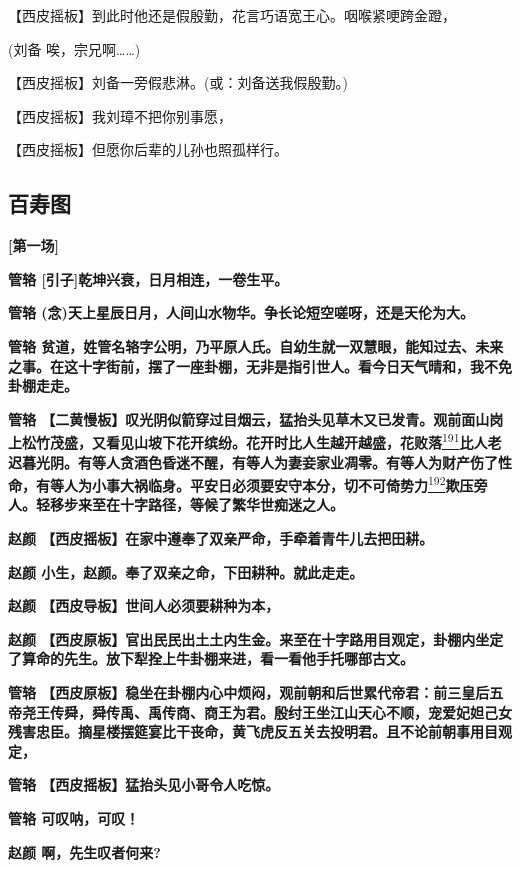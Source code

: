 【西皮摇板】到此时他还是假殷勤，花言巧语宽王心。咽喉紧哽跨金蹬，

(刘备 唉，宗兄啊\ldots{}\ldots{})

【西皮摇板】刘备一旁假悲淋。(或：刘备送我假殷勤。)

【西皮摇板】我刘璋不把你别事愿，

【西皮摇板】但愿你后辈的儿孙也照孤样行。

\hypertarget{ux767eux5bffux56fe}{%
\subsection{百寿图}\label{ux767eux5bffux56fe}}

\textbf{{[}第一场{]}}

\textbf{管辂 {[}引子{]}乾坤兴衰，日月相连，一卷生平。}

\textbf{管辂
(念)天上星辰日月，人间山水物华。争长论短空嗟呀，还是天伦为大。}

\textbf{管辂
贫道，姓管名辂字公明，乃平原人氏。自幼生就一双慧眼，能知过去、未来之事。在这十字街前，摆了一座卦棚，无非是指引世人。看今日天气晴和，我不免卦棚走走。}

\textbf{管辂
【二黄慢板】叹光阴似箭穿过目烟云，猛抬头见草木又已发青。观前面山岗上松竹茂盛，又看见山坡下花开缤纷。花开时比人生越开越盛，花败落}\protect\hyperlink{fn191}{\textsuperscript{191}}\textbf{比人老迟暮光阴。有等人贪酒色昏迷不醒，有等人为妻妾家业凋零。有等人为财产伤了性命，有等人为小事大祸临身。平安日必须要安守本分，切不可倚势力}\protect\hyperlink{fn192}{\textsuperscript{192}}\textbf{欺压旁人。轻移步来至在十字路径，等候了繁华世痴迷之人。}

\textbf{赵颜 【西皮摇板】在家中遵奉了双亲严命，手牵着青牛儿去把田耕。}

\textbf{赵颜 小生，赵颜。奉了双亲之命，下田耕种。就此走走。}

\textbf{赵颜 【西皮导板】世间人必须要耕种为本，}

\textbf{赵颜
【西皮原板】官出民民出土土内生金。来至在十字路用目观定，卦棚内坐定了算命的先生。放下犁拴上牛卦棚来进，看一看他手托哪部古文。}

\textbf{管辂
【西皮原板】稳坐在卦棚内心中烦闷，观前朝和后世累代帝君：前三皇后五帝尧王传舜，舜传禹、禹传商、商王为君。殷纣王坐江山天心不顺，宠爱妃妲己女残害忠臣。摘星楼摆筵宴比干丧命，黄飞虎反五关去投明君。且不论前朝事用目观定，}

\textbf{管辂 【西皮摇板】猛抬头见小哥令人吃惊。}

\textbf{管辂 可叹呐，可叹！}

\textbf{赵颜 啊，先生叹者何来?}

